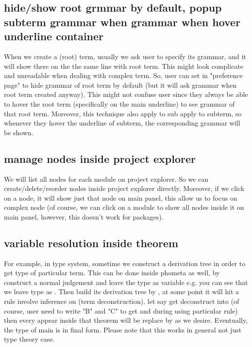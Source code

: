 \documentclass[11pt, a4paper]{article}
\begin{document}
\subsection{hide/show root grmmar by default, popup subterm grammar when  grammar when hover underline container}
When we create a (root) term, usually we ask user to specify its grammar, and it will show there on the the same line with root term. This might look complicate and unreadable when dealing with complex term. So, user can set in "preference page" to hide grammar of root term by default (but it will ask grammar when root term created anyway). This might not confuse user since they always be able to hover the root term (specifically on the main underline) to see grammar of that root term. Moreover, this technique also apply to sub  apply to subterm, so whenever they hover the underline of subterm, the corresponding grammar will be shown.

\subsection{manage nodes inside project explorer}
We will list all nodes for each module on project explorer. So we can create/delete/reorder nodes inside project explorer directly. Moreover, if we click on a node, it will show just that node on main panel, this allow us to focus on complex node (of course, we can click on a module to show all nodes inside it on main panel, however, this doesn't work for packages).

\subsection{variable resolution inside theorem}
For example, in type system, sometime we construct a derivation tree in order to get type of particular term. This can be done inside phometa as well, by construct a normal judgement and leave the type as variable e.g.  you can see that we leave type as . Then build its derivation tree by \kTheorem, at some point it will hit a rule involve inference on  (term deconstruction). let say  get deconstruct into  (of course, user need to write "B" and "C" to get  and  during using particular rule) then every  appear inside that theorem will be replace by  as we desire. Eventually, the type of main is in final form. Please note that this works in general not just type theory case.
\end{document}
